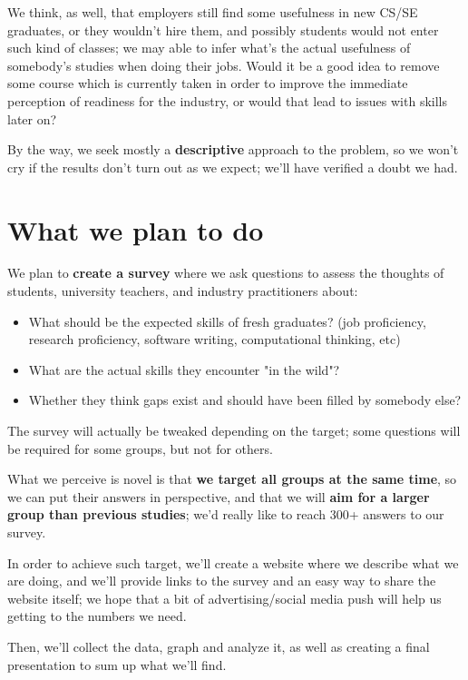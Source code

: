 \documentclass{sigchi}
\begin{document}
 We think, as well, that employers still find some usefulness in new CS/SE graduates, or they wouldn't hire them, and possibly students would not enter such kind of classes; we may able to infer what's the actual usefulness of somebody's studies when doing their jobs. Would it be a good idea to remove some course which is currently taken in order to improve the immediate perception of readiness for the industry, or would that lead to issues with skills later on?
 
 By the way, we seek mostly a \textbf{descriptive} approach to the problem, so we won't cry if the results don't turn out as we expect; we'll have verified a doubt we had.
 
 \section{What we plan to do}
 
 We plan to \textbf{create a survey} where we ask questions to assess the thoughts of students, university teachers, and industry practitioners about:
 \begin{itemize}
 	\item What should be the expected skills of fresh graduates? (job proficiency, research proficiency, software writing, computational thinking, etc)
 	\item What are the actual skills they encounter "in the wild"?
 	\item Whether they think gaps exist and should have been filled by somebody else?

 \end{itemize} 
 
 The survey will actually be tweaked depending on the target; some questions will be required for some groups, but not for others.
 
 What we perceive is novel is that \textbf{we target all groups at the same time}, so we can put their answers in perspective, and that we will \textbf{aim for a larger group than previous studies}; we'd really like to reach 300+ answers to our survey.
 
 In order to achieve such target, we'll create a website where we describe what we are doing, and we'll provide links to the survey and an easy way to share the website itself; we hope that a bit of advertising/social media push will help us getting to the numbers we need.
 
 Then, we'll collect the data, graph and analyze it, as well as creating a final presentation to sum up what we'll find.
 
\end{document}

